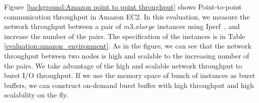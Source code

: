 Figure \ref{background:Amazon point to point throughput} shows Point-to-point
communication throughput in Amazon EC2. In this evaluation,
we measure the network throughput between a pair of $m3.xlarge$ instances using
Iperf~\cite{iperf}, and increase the number of the pairs. The specification of
the instances is in Table \ref{evaluation:amazon_environment}.
As in the figure, we can see that the network throughput between two nodes is
high and scalable to the increasing number of the pairs.
We take advantage of the high and scalable network throughput to burst I/O
throughput. If we use the memory space of bunch of instances as burst
buffers, we can construct on-demand burst buffer with high throughput
and high scalability on the fly.




